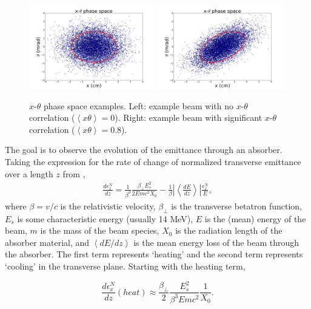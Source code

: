 \begin{figure}
  \begin{center}
    \includegraphics[width=0.49\textwidth]{Figures/ellipse0} 
    \includegraphics[width=0.49\textwidth]{Figures/ellipse1} 
  \caption[$x$-$\theta$ phase space examples.]{$x$-$\theta$ phase space examples. Left: example beam with no $x$-$\theta$ correlation ($\left<x\theta\right>=0$). Right: example beam with significant $x$-$\theta$ correlation ($\left<x\theta\right>=0.8$).}
  \label{fig:ellipses}
 \end{center}
\end{figure}

The goal is to observe the evolution of the emittance through an absorber. Taking the expression for the rate of change of normalized transverse emittance over a length $z$ from \cite{johnson},
\begin{align*}
\frac{d\epsilon^N _x}{dz}=\frac{1}{\beta^3}\frac{\beta_\perp E_s ^2}{2Emc^2 X_0}-\frac{1}{\beta}\left| \left<\frac{dE}{dz}\right>\right| \frac{\epsilon_x^N}{E},
\end{align*}
where $\beta=v/c$ is the relativistic velocity, $\beta_\perp$ is the transverse betatron function, $E_s$ is some characteristic energy (usually 14 MeV), $E$ is the (mean) energy of the beam, $m$ is the mass of the beam species, $X_0$ is the radiation length of the absorber material, and $\left<dE/dz\right>$ is the mean energy loss of the beam through the absorber. The first term represents `heating' and the second term represents `cooling' in the transverse plane. Starting with the heating term,

\begin{equation}
\label{eqn:emittanceheat}
\frac{d\epsilon_x^N}{dz}(heat)\approx\frac{\beta_\perp}{2}\frac{E_s^2}{\beta^3Emc^2}\frac{1}{X_0}.
\end{equation}

